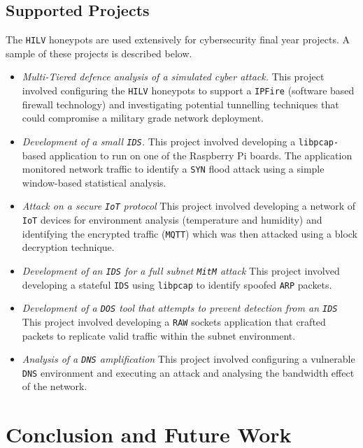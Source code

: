 \documentclass[10pt,journal]{IEEEtran}
\begin{document}
\subsection{Supported Projects\label{Projects}}

The \texttt{HILV} honeypots are used extensively for cybersecurity final year
projects.  A sample of these projects is described below.

\begin{itemize} 
  \item \noindent \emph{Multi-Tiered defence analysis of a simulated cyber
    attack.} This project involved configuring the \texttt{HILV} honeypots to
    support a \texttt{IPFire} (software based firewall technology) and
    investigating potential tunnelling techniques that could compromise a
    military grade network deployment.  
  \item \noindent \emph{Development of a small \texttt{IDS}.} This project
    involved developing a \texttt{libpcap-}based application to run on one of the
    Raspberry Pi boards. The application monitored network
    traffic to identify a \texttt{SYN} flood attack using a simple window-based
    statistical analysis.  
    \item \noindent \emph{Attack on a secure \texttt{IoT} protocol} This
      project involved developing a network of \texttt{IoT} devices for
      environment analysis (temperature and humidity) and identifying the
      encrypted traffic (\texttt{MQTT}) which was then attacked using a block
      decryption technique.  
    \item \noindent \emph{Development of an \texttt{IDS} for a full subnet
      \texttt{MitM} attack} This project involved developing a stateful 
      \texttt{IDS} using \texttt{libpcap} to identify spoofed \texttt{ARP} packets.  
    \item \noindent \emph{Development of a \texttt{DOS} tool that attempts to
      prevent detection from an \texttt{IDS}} This project involved developing
      a \texttt{RAW} sockets application that crafted packets to
      replicate valid traffic within the subnet environment.  
     \item \noindent \emph{Analysis of a \texttt{DNS} amplification} This
       project involved configuring a vulnerable \texttt{DNS} environment and
       executing an attack and analysing the bandwidth effect of the network.
\end{itemize}

\section{Conclusion and Future Work\label{sec:ConclusionFuture}}
\end{document}
